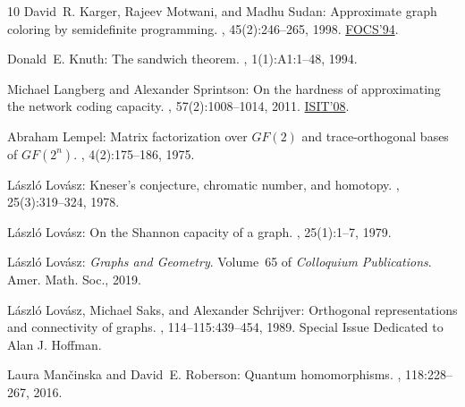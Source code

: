\begin{thebibliography}{10}
{\sc David~R. Karger, Rajeev Motwani, and Madhu Sudan}: Approximate graph
  coloring by semidefinite programming.
, 45(2):246--265, 1998.
\newblock \prelim \href{https:doi.org/10.1109/SFCS.1994.365710}{FOCS'94}.
\newblock [\epfmtdoi{10.1145/274787.274791}]

{\sc Donald~E. Knuth}: The sandwich theorem.
, 1(1):A1:1--48, 1994.
\newblock [\epfmtdoi{10.37236/1193}]

{\sc Michael Langberg and Alexander Sprintson}: On the hardness of
  approximating the network coding capacity.
, 57(2):1008--1014, 2011.
\newblock \prelim \href{https:doi.org/10.1109/ISIT.2008.4594999}{ISIT'08}.

{\sc Abraham Lempel}: Matrix factorization over ${GF(2)}$ and trace-orthogonal
  bases of ${GF(2^{n})}$.
, 4(2):175--186, 1975.
\newblock [\epfmtdoi{10.1137/0204014}]

{\sc L{\'{a}}szl{\'{o}} Lov{\'{a}}sz}: Kneser's conjecture, chromatic number,
  and homotopy.
, 25(3):319--324, 1978.
\newblock [\epfmtdoi{10.1016/0097-3165(78)90022-5}]

{\sc L{\'a}szl{\'o} Lov{\'a}sz}: On the {S}hannon capacity of a graph.
, 25(1):1--7, 1979.

{\sc L{\'{a}}szl{\'{o}} Lov{\'{a}}sz}: {\em Graphs and Geometry}.
\newblock Volume~65 of {\em Colloquium Publications}.
\newblock Amer. Math. Soc., 2019.

{\sc L{\'{a}}szl{\'{o}} Lov{\'{a}}sz, Michael Saks, and Alexander Schrijver}:
  Orthogonal representations and connectivity of graphs.
, 114--115:439--454, 1989.
\newblock Special Issue Dedicated to Alan J. Hoffman.
\newblock [\epfmtdoi{10.1016/0024-3795(89)90475-8}]

{\sc Laura Man{\v{c}}inska and David~E. Roberson}: Quantum homomorphisms.
, 118:228--267, 2016.


\end{thebibliography}
